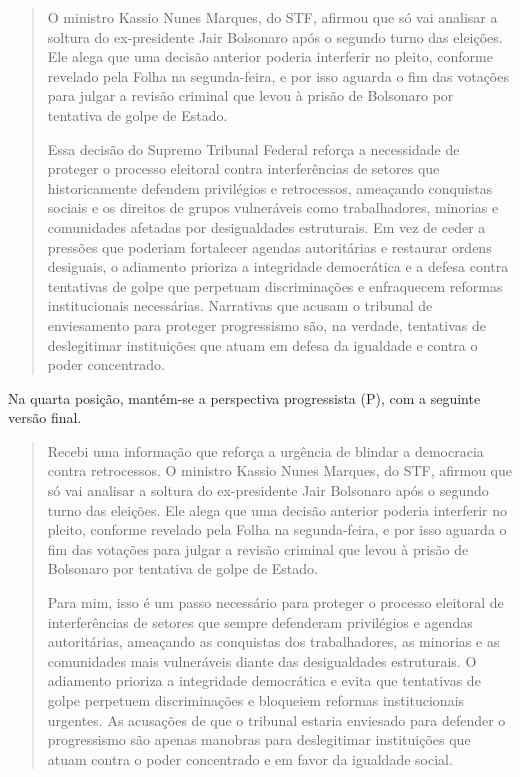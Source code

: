 \begin{quote}
\begin{SingleSpace}
\small
O ministro Kassio Nunes Marques, do STF, afirmou que só vai analisar a soltura do ex-presidente Jair Bolsonaro após o segundo turno das eleições. Ele alega que uma decisão anterior poderia interferir no pleito, conforme revelado pela Folha na segunda-feira, e por isso aguarda o fim das votações para julgar a revisão criminal que levou à prisão de Bolsonaro por tentativa de golpe de Estado.

Essa decisão do Supremo Tribunal Federal reforça a necessidade de proteger o processo eleitoral contra interferências de setores que historicamente defendem privilégios e retrocessos, ameaçando conquistas sociais e os direitos de grupos vulneráveis como trabalhadores, minorias e comunidades afetadas por desigualdades estruturais. Em vez de ceder a pressões que poderiam fortalecer agendas autoritárias e restaurar ordens desiguais, o adiamento prioriza a integridade democrática e a defesa contra tentativas de golpe que perpetuam discriminações e enfraquecem reformas institucionais necessárias. Narrativas que acusam o tribunal de enviesamento para proteger progressismo são, na verdade, tentativas de deslegitimar instituições que atuam em defesa da igualdade e contra o poder concentrado.
\end{SingleSpace}
\end{quote}
Na quarta posição, mantém-se a perspectiva progressista (P), com a seguinte versão final.

\begin{quote}
\begin{SingleSpace}
\small
Recebi uma informação que reforça a urgência de blindar a democracia contra retrocessos. O ministro Kassio Nunes Marques, do STF, afirmou que só vai analisar a soltura do ex-presidente Jair Bolsonaro após o segundo turno das eleições. Ele alega que uma decisão anterior poderia interferir no pleito, conforme revelado pela Folha na segunda-feira, e por isso aguarda o fim das votações para julgar a revisão criminal que levou à prisão de Bolsonaro por tentativa de golpe de Estado.

Para mim, isso é um passo necessário para proteger o processo eleitoral de interferências de setores que sempre defenderam privilégios e agendas autoritárias, ameaçando as conquistas dos trabalhadores, as minorias e as comunidades mais vulneráveis diante das desigualdades estruturais. O adiamento prioriza a integridade democrática e evita que tentativas de golpe perpetuem discriminações e bloqueiem reformas institucionais urgentes. As acusações de que o tribunal estaria enviesado para defender o progressismo são apenas manobras para deslegitimar instituições que atuam contra o poder concentrado e em favor da igualdade social.
\end{SingleSpace}
\end{quote}

